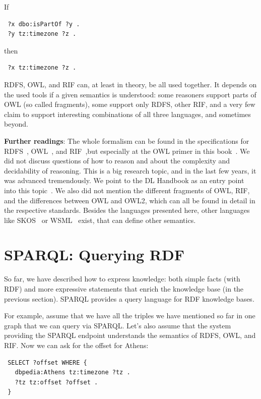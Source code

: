 \documentclass{IOS-Book-Article}
\begin{document}
If
\begin{verbatim}
 ?x dbo:isPartOf ?y .
 ?y tz:timezone ?z .
\end{verbatim}
then
\begin{verbatim}
 ?x tz:timezone ?z .
\end{verbatim}

RDFS, OWL, and RIF can, at least in theory, be all used together.
It depends on the used tools if a given semantics is understood: some reasoners support parts of OWL (so called fragments), some support only RDFS, other RIF, and a very few claim to support interesting combinations of all three languages, and sometimes beyond.

\medskip

\textbf{Further readings}:
The whole formalism can be found in the specifications for RDFS~\cite{rdfs}, OWL~\cite{owl}, and RIF~\cite{rif},but especially at the OWL primer in this book~\cite{dl-primer}.
We did not discuss questions of how to reason and about the complexity and decidability of reasoning. 
This is a big research topic, and in the last few years, it was advanced tremendously. 
We point to the DL Handbook as an entry point into this topic~\cite{dl-handbook}.
We also did not mention the different fragments of OWL, RIF, and the differences between OWL and OWL2, which can all be found in detail in the respective standards.
Besides the languages presented here, other languages like SKOS~\cite{skos} or WSML~\cite{wsml} exist, that can define other semantics.

\section{SPARQL: Querying RDF}
\label{sparql}

So far, we have described how to express knowledge: both simple facts (with RDF) and more expressive statements that enrich the knowledge base (in the previous section).
SPARQL provides a query language for RDF knowledge bases.

For example, assume that we have all the triples we have mentioned so far in one graph that we can query via SPARQL.
Let's also assume that the system providing the SPARQL endpoint understands the semantics of RDFS, OWL, and RIF.
Now we can ask for the offset for Athens:

\begin{verbatim}
 SELECT ?offset WHERE {
   dbpedia:Athens tz:timezone ?tz .
   ?tz tz:offset ?offset .
 }
\end{verbatim}
\end{document}
